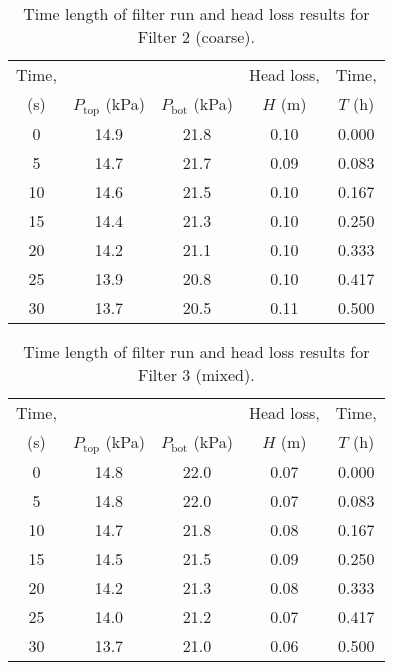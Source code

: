 \documentclass{article}
\begin{document}
\begin{table}[htbp]
\centering
\begin{tabular}{ccccc} \toprule
Time, &  &  & Head loss, & Time, \\ 
(s) & $P_\text{top}$ (kPa) & $P_\text{bot}$ (kPa) & $H$ (m) & $T$ (h) \\ \midrule
0 & 14.9 & 21.8 & 0.10 & 0.000 \\ 
5 & 14.7 & 21.7 & 0.09 & 0.083 \\ 
10 & 14.6 & 21.5 & 0.10 & 0.167 \\ 
15 & 14.4 & 21.3 & 0.10 & 0.250 \\ 
20 & 14.2 & 21.1 & 0.10 & 0.333 \\ 
25 & 13.9 & 20.8 & 0.10 & 0.417 \\ 
30 & 13.7 & 20.5 & 0.11 & 0.500 \\ \bottomrule
\end{tabular}
\caption{Time length of filter run and head loss results for Filter 2 (coarse).}
\label{tab:H_T_filter2}
\end{table}
\vfill

\nopagebreak
\begin{table}[htbp]
\centering
\begin{tabular}{ccccc} \toprule
Time, &  &  & Head loss, & Time, \\ 
(s) & $P_\text{top}$ (kPa) & $P_\text{bot}$ (kPa) & $H$ (m) & $T$ (h) \\ \midrule
0 & 14.8 & 22.0 & 0.07 & 0.000 \\ 
5 & 14.8 & 22.0 & 0.07 & 0.083 \\ 
10 & 14.7 & 21.8 & 0.08 & 0.167 \\ 
15 & 14.5 & 21.5 & 0.09 & 0.250 \\ 
20 & 14.2 & 21.3 & 0.08 & 0.333 \\ 
25 & 14.0 & 21.2 & 0.07 & 0.417 \\ 
30 & 13.7 & 21.0 & 0.06 & 0.500 \\ \bottomrule
\end{tabular}
\caption{Time length of filter run and head loss results for Filter 3 (mixed).}
\label{tab:H_T_filter3}
\end{table}
\vfill
\end{document}
